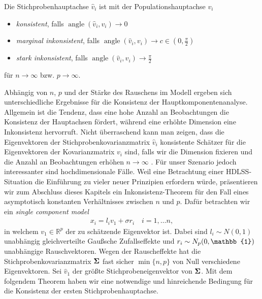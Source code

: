 \begin{defn}
Die Stichprobenhauptachse $\widehat{v}_i$ ist mit der Populationshauptachse $v_i$
\begin{itemize}
\item \textit{konsistent}, falls $\operatorname{angle}(\widehat{v}_i, v_i) \longrightarrow 0$
\item \textit{marginal inkonsistent}, falls $\operatorname{angle}(\widehat{v}_i, v_i) \longrightarrow c \in (0,\frac{\pi}{2})$
\item \textit{stark inkonsistent}, falls $\operatorname{angle}(\widehat{v}_i, v_i) \longrightarrow \frac{\pi}{2}$
\end{itemize} 
für $n \to \infty$ bzw. $p \rightarrow \infty$. 
\end{defn}

Abhängig von $n$, $p$ und der Stärke des Rauschens im Modell ergeben sich unterschiedliche Ergebnisse für die Konsistenz der Hauptkomponentenanalyse. Allgemein ist die Tendenz, dass eine hohe Anzahl an Beobachtungen die Konsistenz der Hauptachsen fördert, während eine erhöhte Dimension eine Inkonsistenz hervorruft. Nicht überraschend kann man zeigen, dass die Eigenvektoren der Stichprobenkovarianzmatrix $\widehat{v}_i$ konsistente Schätzer für die Eigenvektoren der Kovarianzmatrix $v_i$ sind, falls wir die Dimension fixieren und die Anzahl an Beobachtungen erhöhen $n \rightarrow \infty$ \cite{anderson}. Für unser Szenario jedoch interessanter sind hochdimensionale Fälle. Weil eine Betrachtung einer HDLSS-Situation die Einführung zu vieler neuer Prinzipien erfordern würde, präsentieren wir zum Abschluss dieses Kapitels ein Inkonsistenz-Theorem für den Fall eines asymptotisch konstanten Verhältnisses zwischen $n$ und $p$. Dafür betrachten wir ein \textit{single component model} \cite{johnstone}
\begin{align}
\label{single_component_model}
x_i = l_i v_1 + \sigma r_i \quad i = 1, \ldots n,
\end{align}
in welchem $v_1 \in \mathbb{R}^p$ der zu schätzende Eigenvektor ist. Dabei sind $l_i \sim N(0,1)$ unabhängig gleichverteilte Gaußsche Zufallseffekte und $r_i \sim N_p(0, \mat{\mathbb{1}})$ unabhängige Rauschvektoren. Wegen der Rauscheffekte hat die Stichprobenkovarianzmatrix $\mathbf{\Sigma}$ fast sicher $\min\{n,p\}$ von Null verschiedene Eigenvektoren. Sei $\widehat{v}_1$ der größte Stichprobeneigenvektor von $\mathbf{\Sigma}$. Mit dem folgendem Theorem haben wir eine notwendige und hinreichende Bedingung für die Konsistenz der ersten Stichprobenhauptachse.

